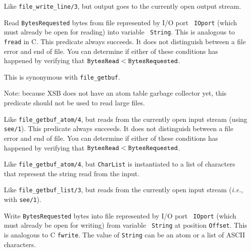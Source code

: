 \begin{description}
   Like \verb|file_write_line/3|, but output goes to the currently open
   output stream.


Read {\tt BytesRequested} bytes from file represented by I/O port {\tt
  IOport} (which must already be open for reading) into variable {\tt
  String}. This is analogous to {\tt fread} in C.  This predicate always
succeeds. It does not distinguish between a file error and end of file.
        You can determine if either of these conditions has happened by verifying
that $\tt BytesRead < BytesRequested$.


This is synonymous with \verb|file_getbuf|.

Note: because XSB does not have an atom table garbage collector yet, this
predicate should not be used to read large files.

Like \verb|file_getbuf_atom/4|, but reads from the currently open input stream
(using {\tt see/1}). This predicate always
succeeds. It does not distinguish between a file error and end of file.
You can determine if either of these conditions has happened by verifying
that $\tt BytesRead < BytesRequested$.

Like \verb|file_getbuf_atom/4|, but {\tt CharList} is instantiated to a list
of characters that represent the string read from the input.

Like \verb|file_getbuf_list/3|, but reads from the currently open input stream
({\it i.e.}, with {\tt see/1}).


Write {\tt BytesRequested} bytes into file represented by I/O port {\tt
  IOport} (which must already be open for writing) from variable {\tt
  String} at position {\tt Offset}. This is analogous to C {\tt fwrite}.
The value of {\tt String} can be an atom or a list of ASCII characters.


\end{description}
